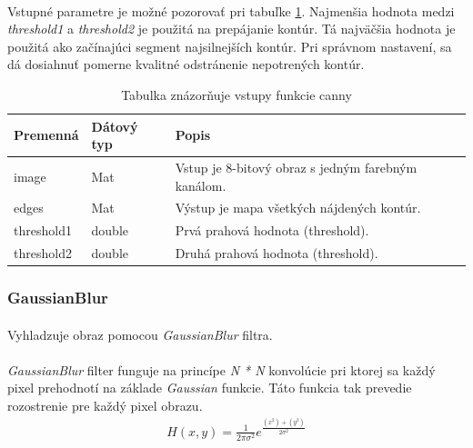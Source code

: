 \documentclass[12pt]{article}
\begin{document}
\paragraph{}
Vstupné parametre je možné pozorovať pri tabuľke \ref{cannyPar}.
Najmenšia hodnota medzi \emph{threshold1} a \emph{threshold2} je použitá na prepájanie kontúr. Tá najväčšia hodnota je použitá ako začínajúci segment najsilnejších kontúr.
Pri správnom nastavení, sa dá dosiahnuť pomerne kvalitné odstránenie nepotrených kontúr.
\cite{OpenCVDoc}
\begin{table}
	\centering
    \begin{tabular}{ | l | l | p{5cm} |}
    \hline
    Premenná & Dátový typ & Popis \\ \hline
    image & Mat & Vstup je 8-bitový obraz s jedným farebným kanálom. \\ \hline
    edges & Mat & Výstup je mapa všetkých nájdených kontúr. \\ \hline
    threshold1 & double & Prvá prahová hodnota (threshold). \\ \hline
    threshold2 & double & Druhá prahová hodnota (threshold). \\
    \hline
    \end{tabular}
  	\caption{Tabulka znázorňuje vstupy funkcie canny}
  	\label{cannyPar}
\end{table}
\subsubsection{GaussianBlur}
\paragraph{}
Vyhladzuje obraz pomocou \emph{GaussianBlur} filtra.
\cite{OpenCVDoc}
\paragraph{}
\emph{GaussianBlur} filter funguje na princípe \emph{N * N} konvolúcie pri ktorej sa každý pixel prehodnotí na základe \emph{Gaussian} funkcie.
Táto funkcia tak prevedie rozostrenie pre každý pixel obrazu.
\cite{gaussianblur}
\begin{align*}
H(x,y) = \frac{1}{2\pi\sigma^2}e^{\frac{(x^2)+(y^2)}{2\sigma^2}}
\end{align*}
\end{document}
